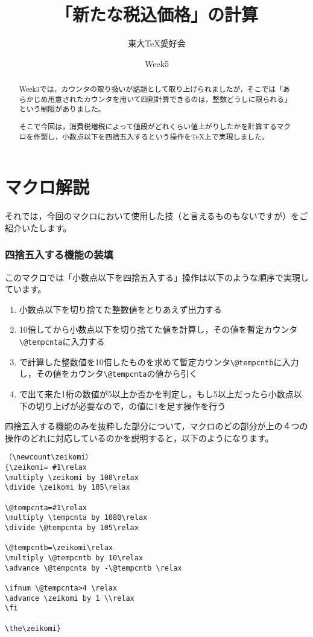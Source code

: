 \documentclass[autodetect-engine,dvipdfmx]{jsarticle}
\title{「新たな税込価格」の計算}
\author{東大TeX愛好会}
\date{Week5}
\begin{document}
\maketitle

\begin{abstract}
Week3では，カウンタの取り扱いが話題として取り上げられましたが，そこでは「あらかじめ用意されたカウンタを用いて四則計算できるのは，整数どうしに限られる」という制限がありました。

そこで今回は，消費税増税によって値段がどれくらい値上がりしたかを計算するマクロを作製し，小数点以下を四捨五入するという操作を\TeX 上で実現しました。
\end{abstract}

\part{マクロ解説}

それでは，今回のマクロにおいて使用した技（と言えるものもないですが）をご紹介いたします。

\section{四捨五入する機能の装填}

このマクロでは「小数点以下を四捨五入する」操作は以下のような順序で実現しています。

\renewcommand{\labelenumi}{\ajMaru{\theenumi}}

\begin{enumerate}
\item 小数点以下を切り捨てた整数値をとりあえず出力する
\item 10倍してから小数点以下を切り捨てた値を計算し，その値を暫定カウンタ\verb|\@tempcnta|に入力する
\item {}で計算した整数値を10倍したものを求めて暫定カウンタ\verb|\@tempcntb|に入力し，その値をカウンタ\verb|\@tempcnta|の値から引く
\item {}で出て来た1桁の数値が5以上か否かを判定し，もし5以上だったら小数点以下の切り上げが必要なので，の値に1を足す操作を行う
\end{enumerate}

四捨五入する機能のみを抜粋した部分について，マクロのどの部分が上の４つの操作のどれに対応しているのかを説明すると，以下のようになります。

\begin{tcolorbox}[breakable]

\begin{verbatim}
（\newcount\zeikomi）
{\zeikomi= #1\relax
\multiply \zeikomi by 108\relax
\divide \zeikomi by 105\relax

\@tempcnta=#1\relax
\multiply \tempcnta by 1080\relax
\divide \@tempcnta by 105\relax

\@tempcntb=\zeikomi\relax
\multiply \@tempcntb by 10\relax
\advance \@tempcnta by -\@tempcntb \relax

\ifnum \@tempcnta>4 \relax
\advance \zeikomi by 1 \\relax
\fi 

\the\zeikomi}
\end{verbatim}

\end{tcolorbox}
\end{document}

